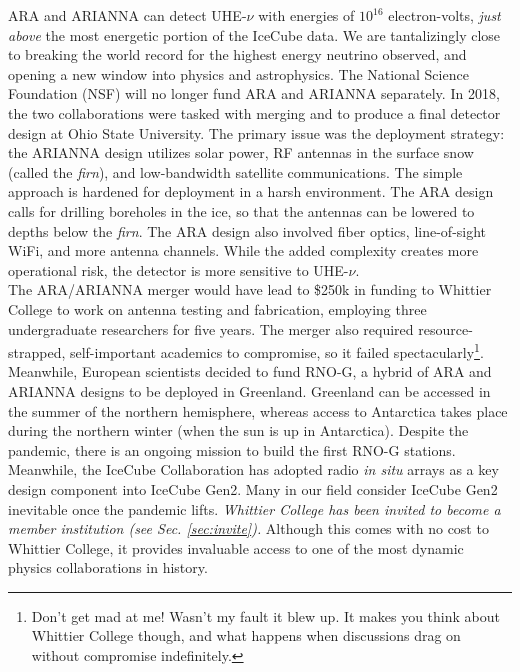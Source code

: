 \documentclass[../../../main.tex]{subfiles}
\begin{document}
ARA and ARIANNA can detect UHE-$\nu$ with energies of $10^{16}$ electron-volts, \textit{just above} the most energetic portion of the IceCube data.  We are tantalizingly close to breaking the world record for the highest energy neutrino observed, and opening a new window into physics and astrophysics.  The National Science Foundation (NSF) will no longer fund ARA and ARIANNA separately.  In 2018, the two collaborations were tasked with merging and to produce a final detector design at Ohio State University.  The primary issue was the deployment strategy: the ARIANNA design utilizes solar power, RF antennas in the surface snow (called the \textit{firn}), and low-bandwidth satellite communications.  The simple approach is hardened for deployment in a harsh environment.  The ARA design calls for drilling boreholes in the ice, so that the antennas can be lowered to depths below the \textit{firn}.  The ARA design also involved fiber optics, line-of-sight WiFi, and more antenna channels.  While the added complexity creates more operational risk, the detector is more sensitive to UHE-$\nu$.
\\
\vspace{0.15cm}
The ARA/ARIANNA merger would have lead to \$250k in funding to Whittier College to work on antenna testing and fabrication, employing three undergraduate researchers for five years.  The merger also required resource-strapped, self-important academics to compromise, so it failed spectacularly\footnote{Don't get mad at me!  Wasn't my fault it blew up.  It makes you think about Whittier College though, and what happens when discussions drag on without compromise indefinitely.}.  Meanwhile, European scientists decided to fund RNO-G, a hybrid of ARA and ARIANNA designs to be deployed in Greenland.  Greenland can be accessed in the summer of the northern hemisphere, whereas access to Antarctica takes place during the northern winter (when the sun is up in Antarctica).  Despite the pandemic, there is an ongoing mission to build the first RNO-G stations.  Meanwhile, the IceCube Collaboration has adopted radio \textit{in situ} arrays as a key design component into IceCube Gen2.  Many in our field consider IceCube Gen2 inevitable once the pandemic lifts.  \textit{Whittier College has been invited to become a member institution (see Sec. \ref{sec:invite}).}  Although this comes with no cost to Whittier College, it provides invaluable access to one of the most dynamic physics collaborations in history.
\end{document}
